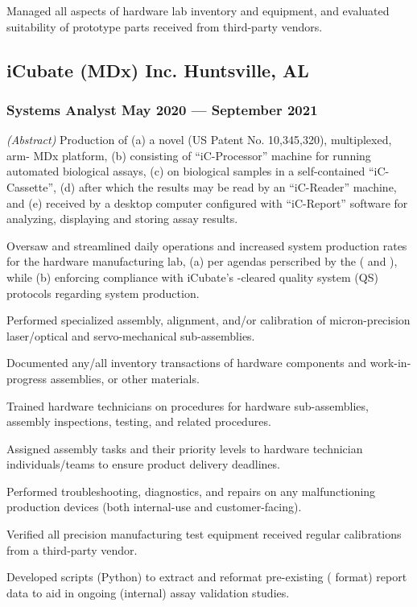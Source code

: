 \documentclass[letterpaper, oneside, 10pt]{article}
\begin{document}
Managed all aspects of hardware lab inventory and equipment, and evaluated
suitability of prototype parts received from third-party vendors.


\subsection*{iCubate (MDx) Inc.\DotSep{0.25em} Huntsville, AL}
\subsubsection*{Systems Analyst\DotSep{0.25em} May 2020 --- September 2021}

\textit{(Abstract)}\DotSep{0.25em} Production of (a) a novel (US Patent No.
10,345,320), multiplexed, arm- MDx platform, (b) consisting of
``iC-Processor'' machine for running automated biological assays, (c) on
biological samples in a self-contained ``iC-Cassette'', (d) after which the
results may be read by an ``iC-Reader'' machine, and (e) received by a desktop
computer configured with ``iC-Report'' software for analyzing, displaying and
storing assay results.

Oversaw and streamlined daily operations and increased system production rates
for the hardware manufacturing lab, (a) per agendas perscribed by the (
and ), while (b) enforcing compliance with iCubate's -cleared
quality system (QS) protocols regarding system production.

Performed specialized assembly, alignment, and/or calibration of
micron-precision laser/optical and servo-mechanical sub-assemblies.

Documented any/all inventory transactions of hardware components and
work-in-progress assemblies, or other materials.

Trained hardware technicians on procedures for hardware sub-assemblies,
assembly inspections, testing, and related procedures.

Assigned assembly tasks and their priority levels to hardware technician
individuals/teams to ensure product delivery deadlines.

Performed troubleshooting, diagnostics, and repairs on any malfunctioning
production devices (both internal-use and customer-facing).

Verified all precision manufacturing test equipment received regular
calibrations from a third-party vendor.

Developed scripts (Python) to extract and reformat pre-existing (
format) report data to aid in ongoing (internal) assay validation studies.
\end{document}
